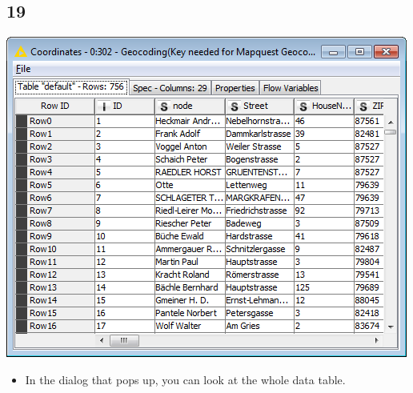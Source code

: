 \documentclass{beamer}
\begin{document}
\subsection{19}
\begin{frame}
	\begin{center}
  		\includegraphics[height=0.6\textheight]{19.png}
	\end{center}
	\begin{itemize}
		\item In the dialog that pops up, you can look at the whole data table.
	\end{itemize}
\end{frame}
\end{document}
